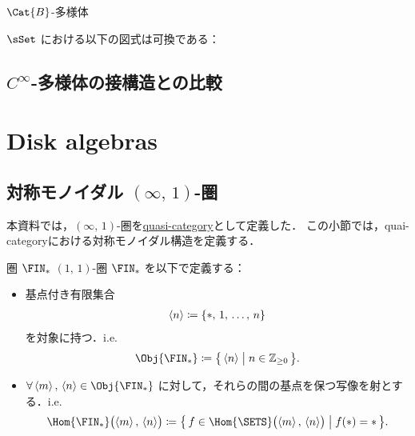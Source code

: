 \documentclass[TQFT_main]{subfiles}
\begin{document}
\begin{mydef}[label=def:B-mfld,breakable]{{$\Cat{B}$}-多様体}
\begin{itemize}
\begin{description}
            $\sSet$ における以下の図式は可換である：
            \begin{center}
            \end{center}
        \end{description}
    \end{itemize}
\end{mydef}

\subsection{$C^\infty$-多様体の接構造との比較}

\section{Disk algebras}

\subsection{対称モノイダル {$(\infty,\, 1)$}-圏}

本資料では，$(\infty,\, 1)$-圏を\hyperref[def:infty-1]{quasi-category}として定義した．
この小節では，quai-categoryにおける対称モノイダル構造を定義する．

\begin{mydef}[label=def:Fin]{圏 {$\FIN_*$}}
    $(1,\, 1)$-圏 $\FIN_*$ を以下で定義する：
    \begin{itemize}
        \item 基点付き有限集合
        \begin{align}
            \expval{n} \coloneqq \{*,\, 1,\, \dots,\, n\}
        \end{align}
        を対象に持つ．i.e.
        \begin{align}
            \Obj{\FIN_*} \coloneqq \bigl\{\, \expval{n} \bigm| n \in \mathbb{Z}_{\ge 0} \,\bigr\}.
        \end{align}
        \item $\forall \expval{m},\, \expval{n} \in \Obj{\FIN_*}$ に対して，それらの間の基点を保つ写像を射とする．i.e.
        \begin{align}
            \Hom{\FIN_*}\bigl( \expval{m},\, \expval{n} \bigr)  \coloneqq \bigl\{\, f \in \Hom{\SETS} \bigl( \expval{m},\, \expval{n} \bigr)  \bigm| f(*) = * \,\bigr\}.
        \end{align}
    \end{itemize}
\end{mydef}
\end{document}
